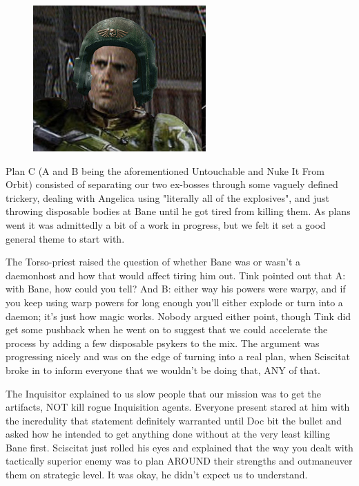 \begin{figure}
	\begin{center}
		\includegraphics[width=\figwidth]{pics/19/13.png}
	\end{center}
\end{figure}
Plan C (A and B being the aforementioned Untouchable and Nuke It From Orbit) consisted of separating our two ex-bosses through some vaguely defined trickery, dealing with Angelica using "literally all of the explosives", and just throwing disposable bodies at Bane until he got tired from killing them. 
As plans went it was admittedly a bit of a work in progress, but we felt it set a good general theme to start with.

The Torso-priest raised the question of whether Bane was or wasn't a daemonhost and how that would affect tiring him out. 
Tink pointed out that A: 
with Bane, how could you tell? 
And B: 
either way his powers were warpy, and if you keep using warp powers for long enough you'll either explode or turn into a daemon; 
it's just how magic works. 
Nobody argued either point, though Tink did get some pushback when he went on to suggest that we could accelerate the process by adding a few disposable psykers to the mix. 
The argument was progressing nicely and was on the edge of turning into a real plan, when Sciscitat broke in to inform everyone that we wouldn't be doing that, ANY of that. 


The Inquisitor explained to us slow people that our mission was to get the artifacts, NOT kill rogue Inquisition agents. 
Everyone present stared at him with the incredulity that statement definitely warranted until Doc bit the bullet and asked how he intended to get anything done without at the very least killing Bane first. 
Sciscitat just rolled his eyes and explained that the way you dealt with tactically superior enemy was to plan AROUND their strengths and outmaneuver them on strategic level. 
It was okay, he didn't expect us to understand. 


